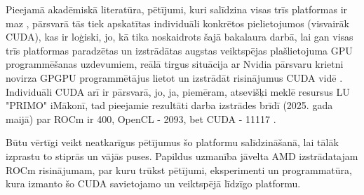 Pieejamā akadēmiskā literatūra, pētījumi, kuri salīdzina visas trīs platformas
ir maz \cite{google_scholar, 10.1145/3529538.3529980}, pārsvarā tās tiek
apskatītas individuāli konkrētos pielietojumos (visvairāk CUDA), kas ir
loģiski, jo, kā tika noskaidrots šajā bakalaura darbā, lai gan visas trīs
platformas paradzētas un izstrādātas augstas veiktspējas plašlietojuma GPU
programmēšanas uzdevumiem, reālā tirgus situācija ar Nvidia pārsvaru krietni
novirza GPGPU programmētājus lietot un izstrādāt risinājumus CUDA vidē
\cite{kursa-darbs}. Individuāli CUDA arī ir pārsvarā, jo, ja, piemēram,
atsevišķi meklē resursus LU "PRIMO" iMākonī, tad pieejamie rezultāti darba
izstrādes brīdī (2025. gada maijā) par ROCm ir 400, OpenCL - 2093, bet CUDA -
11117 \cite{primo}.

Būtu vērtīgi veikt neatkarīgus pētījumus šo platformu salīdzināšanā, lai tālāk
izprastu to stiprās un vājās puses. Papildus uzmanība jāvelta AMD izstrādatajam
ROCm risinājumam, par kuru trūkst pētījumi, eksperimenti un programmatūra, kura
izmanto šo CUDA savietojamo un veiktspējā līdzīgo platformu.



